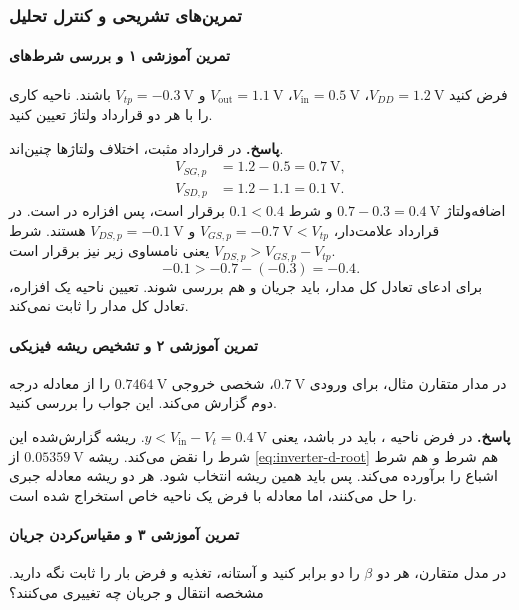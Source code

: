 \subsubsection{تمرین‌های تشریحی و کنترل تحلیل}
\label{sec:inverter-practice}
\paragraph*{تمرین آموزشی ۱ و بررسی شرط‌های }
فرض کنید \(V_{DD}=\qty{1.2}{\volt}\)،
\(V_{\mathrm{in}}=\qty{0.5}{\volt}\)،
\(V_{\mathrm{out}}=\qty{1.1}{\volt}\) و
\(V_{tp}=-\qty{0.3}{\volt}\) باشند. ناحیه کاری 
را با هر دو قرارداد ولتاژ تعیین کنید.

\textbf{پاسخ.}
در قرارداد مثبت، اختلاف ولتاژها چنین‌اند.
\[
 \begin{aligned}
 V_{SG,p}&=1.2-0.5=\qty{0.7}{\volt},\\
 V_{SD,p}&=1.2-1.1=\qty{0.1}{\volt}.
 \end{aligned}
\]
اضافه‌ولتاژ \(0.7-0.3=\qty{0.4}{\volt}\) و شرط
\(0.1<0.4\) برقرار است، پس افزاره در  است.
در قرارداد علامت‌دار، \(V_{GS,p}=-\qty{0.7}{\volt}<V_{tp}\)
و \(V_{DS,p}=-\qty{0.1}{\volt}\) هستند.
شرط \(V_{DS,p}>V_{GS,p}-V_{tp}\) یعنی
نامساوی زیر نیز برقرار است.
\[
 -0.1>-0.7-(-0.3)=-0.4.
\]
برای ادعای تعادل کل مدار، باید جریان  و 
هم بررسی شوند. تعیین ناحیه یک افزاره، تعادل کل مدار را ثابت نمی‌کند.

\paragraph*{تمرین آموزشی ۲ و تشخیص ریشه فیزیکی}
در مدار متقارن مثال، برای ورودی \(\qty{0.7}{\volt}\)،
شخصی خروجی \(\qty{0.7464}{\volt}\) را از معادله درجه دوم
گزارش می‌کند. این جواب را بررسی کنید.

\textbf{پاسخ.}
در فرض ناحیه ، باید  در  باشد، یعنی
\(y<V_{\mathrm{in}}-V_t=\qty{0.4}{\volt}\).
ریشه گزارش‌شده این شرط را نقض می‌کند.
ریشه \(\qty{0.05359}{\volt}\) از \eqref{eq:inverter-d-root}
هم شرط  و هم شرط اشباع  را برآورده می‌کند.
پس باید همین ریشه انتخاب شود. هر دو ریشه معادله جبری را حل
می‌کنند، اما معادله با فرض یک ناحیه خاص استخراج شده است.

\paragraph*{تمرین آموزشی ۳ و مقیاس‌کردن جریان}
در مدل متقارن، هر دو \(\beta\) را دو برابر کنید و آستانه، تغذیه
و فرض بار  را ثابت نگه دارید. مشخصه انتقال و جریان چه
تغییری می‌کنند؟

